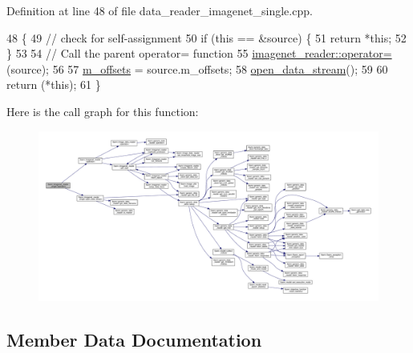 Definition at line 48 of file data\+\_\+reader\+\_\+imagenet\+\_\+single.\+cpp.


\begin{DoxyCode}
48                                                                                               \{
49   \textcolor{comment}{// check for self-assignment}
50   \textcolor{keywordflow}{if} (\textcolor{keyword}{this} == &source) \{
51     \textcolor{keywordflow}{return} *\textcolor{keyword}{this};
52   \}
53 
54   \textcolor{comment}{// Call the parent operator= function}
55   \hyperlink{classlbann_1_1imagenet__reader_a5ea15cc16aa679a2cb549b44eb77f323}{imagenet\_reader::operator=}(source);
56 
57   \hyperlink{classlbann_1_1imagenet__reader__single_a605ba53f4e3fa02a4fced38d41465a10}{m\_offsets} = source.m\_offsets;
58   \hyperlink{classlbann_1_1imagenet__reader__single_a8db14d15bfc2de92ffb3c20f1a38dd00}{open\_data\_stream}();
59 
60   \textcolor{keywordflow}{return} (*\textcolor{keyword}{this});
61 \}
\end{DoxyCode}
Here is the call graph for this function\+:\nopagebreak
\begin{figure}[H]
\begin{center}
\leavevmode
\includegraphics[width=350pt]{classlbann_1_1imagenet__reader__single_af38327f44f1de2dd191cd2d1dc193900_cgraph}
\end{center}
\end{figure}


\subsection{Member Data Documentation}
\mbox{\label{classlbann_1_1imagenet__reader__single_af617e1b0b019049682db6de6e01b05ca}} 
